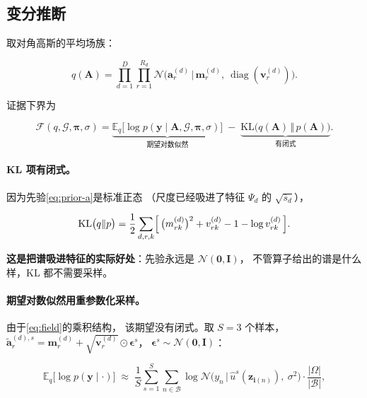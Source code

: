 \documentclass[11pt,a4paper]{article}
\begin{document}
\subsection{变分推断}

取对角高斯的平均场族：

\begin{equation}
q(\mathbf{A}) = \prod_{d=1}^{D}\prod_{r=1}^{R_d}
  \mathcal{N}\bigl(\mathbf{a}^{(d)}_r \,\big|\, \mathbf{m}^{(d)}_r,\ \operatorname{diag}(\mathbf{v}^{(d)}_r)\bigr).
\label{eq:q}
\end{equation}

证据下界为

\begin{equation}
\mathcal{F}(q, \mathcal{G}, \boldsymbol{\pi}, \sigma)
= \underbrace{\mathbb{E}_{q}\bigl[\log p(\mathbf{y} \mid \mathbf{A}, \mathcal{G}, \boldsymbol{\pi}, \sigma)\bigr]}_{\text{期望对数似然}}
  \;-\; \underbrace{\mathrm{KL}\bigl(q(\mathbf{A}) \,\Vert\, p(\mathbf{A})\bigr)}_{\text{有闭式}} .
\label{eq:elbo}
\end{equation}

\paragraph{KL 项有闭式。}因为先验\cref{eq:prior-a}是标准正态
（尺度已经吸进了特征 $\Psi_d$ 的 $\sqrt{\bar{s}_d}$），

\begin{equation}
\mathrm{KL}\bigl(q \Vert p\bigr) = \frac{1}{2}\sum_{d,r,k}
  \Bigl[\,\bigl(m^{(d)}_{rk}\bigr)^2 + v^{(d)}_{rk} - 1 - \log v^{(d)}_{rk}\,\Bigr].
\end{equation}

\textbf{这是把谱吸进特征的实际好处}：先验永远是 $\mathcal{N}(\mathbf{0},\mathbf{I})$，
不管算子给出的谱是什么样，KL 都不需要采样。

\paragraph{期望对数似然用重参数化采样。}由于\cref{eq:field}的乘积结构，
该期望没有闭式。取 $S = 3$ 个样本，
$\tilde{\mathbf{a}}^{(d),s}_r = \mathbf{m}^{(d)}_r + \sqrt{\mathbf{v}^{(d)}_r} \odot \boldsymbol{\epsilon}^{s}$，
$\boldsymbol{\epsilon}^{s} \sim \mathcal{N}(\mathbf{0},\mathbf{I})$：

\begin{equation}
\mathbb{E}_{q}\bigl[\log p(\mathbf{y} \mid \cdot)\bigr]
\;\approx\; \frac{1}{S}\sum_{s=1}^{S}\sum_{n \in \mathcal{B}}
  \log \mathcal{N}\bigl(y_n \,\big|\, \hat{u}^{s}(\mathbf{z}_{\mathbf{i}(n)}),\ \sigma^2\bigr)
  \cdot \frac{\lvert\Omega\rvert}{\lvert\mathcal{B}\rvert},
\end{equation}
\end{document}
